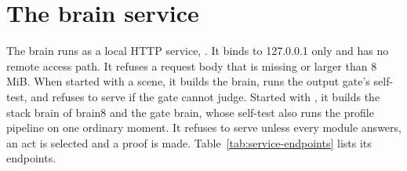 \section{The brain service}\label{sec:home-service}

The brain runs as a local HTTP service, . It binds to 127.0.0.1 only and has no
remote access path. It refuses a request body that is missing or larger than 8\,MiB. When started
with a scene, it builds the brain, runs the output gate's self-test, and refuses to serve if the gate
cannot judge. Started with , it builds the stack brain of brain8 and the gate brain, whose self-test also
runs the \deme{} profile pipeline on one ordinary moment. It refuses to serve unless every module
answers, an act is selected and a proof is made. Table~\ref{tab:service-endpoints} lists its
endpoints.

